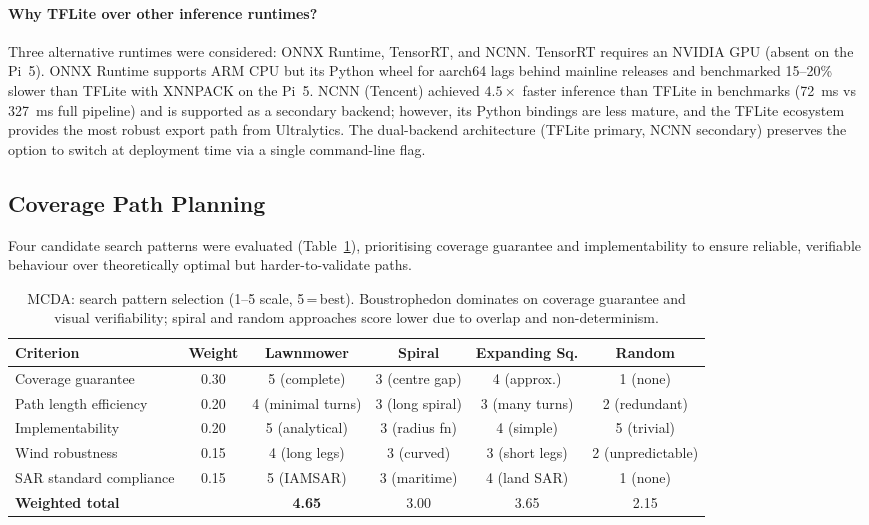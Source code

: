 \paragraph{Why TFLite over other inference runtimes?} Three alternative runtimes were considered: ONNX Runtime, TensorRT, and NCNN. TensorRT requires an NVIDIA GPU (absent on the Pi~5). ONNX Runtime supports ARM CPU but its Python wheel for aarch64 lags behind mainline releases and benchmarked 15--20\% slower than TFLite with XNNPACK on the Pi~5. NCNN (Tencent) achieved $4.5\times$ faster inference than TFLite in benchmarks (\SI{72}{\milli\second} vs \SI{327}{\milli\second} full pipeline) and is supported as a secondary backend; however, its Python bindings are less mature, and the TFLite ecosystem provides the most robust export path from Ultralytics. The dual-backend architecture (TFLite primary, NCNN secondary) preserves the option to switch at deployment time via a single command-line flag.

\subsection{Coverage Path Planning}\label{sec:plan-rationale}

Four candidate search patterns were evaluated (Table~\ref{tab:mcda-search}), prioritising coverage guarantee and implementability to ensure reliable, verifiable behaviour over theoretically optimal but harder-to-validate paths.

\begin{table}[H]
  \centering\compactTable
  \caption{MCDA: search pattern selection (1--5 scale, 5\,=\,best).  Boustrophedon dominates on coverage guarantee and visual verifiability; spiral and random approaches score lower due to overlap and non-determinism.}
  \label{tab:mcda-search}
  \begin{tabularx}{\textwidth}{X c c c c c}
    \toprule
    \textbf{Criterion} & \textbf{Weight} & \textbf{Lawnmower} & \textbf{Spiral} & \textbf{Expanding Sq.} & \textbf{Random} \\
    \midrule
    Coverage guarantee           & 0.30 & 5 (complete)  & 3 (centre gap) & 4 (approx.)  & 1 (none) \\
    Path length efficiency       & 0.20 & 4 (minimal turns) & 3 (long spiral) & 3 (many turns) & 2 (redundant) \\
    Implementability             & 0.20 & 5 (analytical) & 3 (radius fn)  & 4 (simple)    & 5 (trivial) \\
    Wind robustness              & 0.15 & 4 (long legs)  & 3 (curved)     & 3 (short legs) & 2 (unpredictable) \\
    SAR standard compliance      & 0.15 & 5 (IAMSAR)    & 3 (maritime)   & 4 (land SAR)  & 1 (none) \\
    \midrule
    \textbf{Weighted total}      &      & \textbf{4.65} & 3.00           & 3.65          & 2.15 \\
    \bottomrule
  \end{tabularx}
\end{table}

